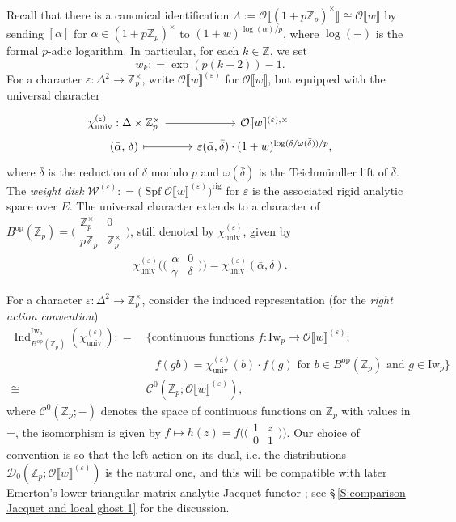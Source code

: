 \documentclass[12pt]{amsart}
\theoremstyle{definition}
\numberwithin{equation}{subsection}
\def\calC{\mathcal{C}}
\def\calD{\mathcal{D}}
\def\calO{\mathcal{O}}
\def\calW{\mathcal{W}}
\def\ZZ{\mathbb{Z}}
\DeclareMathOperator{\Spf}{Spf}
\newcommand{\op}{\mathrm{op}}
\newcommand{\Iw}{\mathrm{Iw}}
\newcommand{\rig}{\mathrm{rig}}
\newcommand{\univ}{\mathrm{univ}}
\DeclareMathOperator{\Ind}{Ind}
\newcommand{\Matrix}[4]{{\big(\begin{smallmatrix}#1&#2\\#3& #4\end{smallmatrix} \big)}}
\begin{document}
Recall that there is a canonical identification $\Lambda:=\calO\llbracket (1+p\ZZ_p)^\times\rrbracket \cong \calO\llbracket w\rrbracket$ by sending $[\alpha]$ for $\alpha \in (1+p\ZZ_p)^\times$ to $(1+w)^{\log(\alpha)/p}$, where $\log(-)$ is the formal $p$-adic logarithm. In particular, for each $k \in \ZZ$, we set
$$
w_k: = \exp(p(k-2))-1.
$$
For a character $\varepsilon:\Delta^2 \to \ZZ_p^\times$, write $\calO\llbracket w\rrbracket^{(\varepsilon)}$ for $\calO\llbracket w\rrbracket$, but equipped with the universal character
$$
\begin{tikzcd}[row sep=0pt]
\chi^{(\varepsilon)}_\univ: \Delta \times \ZZ_p^\times \ar[r] & \calO\llbracket w\rrbracket^{(\varepsilon), \times}
\\
(\bar \alpha, \,\delta) \ar[r, mapsto] & \varepsilon(\bar \alpha, \bar \delta) \cdot (1+w)^{\log(\delta/\omega(\bar \delta))/p},
\end{tikzcd}
$$where $\bar \delta$ is the reduction of $\delta$ modulo $p$ and $\omega(\bar \delta)$ is the Teichm\"umller lift of $\bar \delta$. The \emph{weight disk} $\calW^{(\varepsilon)}: = \big(\Spf\calO\llbracket w\rrbracket^{(\varepsilon)}\big)^\rig$ for $\varepsilon$ is the associated rigid analytic space over $E$.
The universal character extends to a character of $B^\op(\ZZ_p) =\Matrix{\ZZ_p^\times}{0}{p\ZZ_p}{\ZZ_p^\times}$, still denoted by $\chi_\univ^{(\varepsilon)}$,
given by
\begin{equation}
\label{E:universal character}
\chi_\univ^{(\varepsilon)} \big( \Matrix \alpha0 \gamma\delta) = \chi_\univ^{(\varepsilon)}(\bar \alpha, \delta).
\end{equation}

For a character $\varepsilon: \Delta^2 \to \ZZ_p^\times$, consider the induced representation (for the \emph{right action convention})
\begin{align}
\label{E:Ind B to Iw}
\Ind_{B^\op(\ZZ_p)}^{\Iw_p}(\chi_\univ^{(\varepsilon)}): = &\ \big\{ \textrm{continuous functions }f: \Iw_p \to  \calO\llbracket w\rrbracket^{(\varepsilon)};
\\ \nonumber &\quad f(gb) = \chi_\univ^{(\varepsilon)}(b) \cdot f(g) \textrm{ for }b \in B^\op(\ZZ_p) \textrm{ and } g \in \Iw_p\big\}
\\
\cong &\ \calC^0(\ZZ_p; \calO\llbracket w\rrbracket^{(\varepsilon)}),
\end{align}
where $\calC^0(\ZZ_p;-)$ denotes the space of continuous functions on $\ZZ_p$ with values in $-$, the isomorphism is given by $f \mapsto h(z)=f\big(\Matrix 1z01\big)$.
Our choice of convention is so that the left action on its dual, i.e. the distributions $\calD_0(\ZZ_p;\calO\llbracket w\rrbracket^{(\varepsilon)})$ is the natural one, and this will be compatible with later Emerton's lower triangular matrix analytic Jacquet functor \cite{emerton-Jacquet}; see \S\,\ref{S:comparison Jacquet and local ghost 1} for the discussion.
\end{document}
